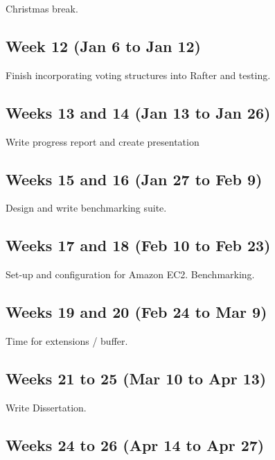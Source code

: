 \documentclass[12pt]{scrartcl}
\begin{document}
Christmas break.


\subsection{Week 12 (Jan 6 to Jan 12)%
  \label{week-12-jan-6-to-jan-12}%
}

Finish incorporating voting structures into Rafter and testing.


\subsection{Weeks 13 and 14 (Jan 13 to Jan 26)%
  \label{weeks-13-and-14-jan-13-to-jan-26}%
}

Write progress report and create presentation


\subsection{Weeks 15 and 16 (Jan 27 to Feb 9)%
  \label{weeks-15-and-16-jan-27-to-feb-9}%
}

Design and write benchmarking suite.


\subsection{Weeks 17 and 18 (Feb 10 to Feb 23)%
  \label{weeks-17-and-18-feb-10-to-feb-23}%
}

Set-up and configuration for Amazon EC2. Benchmarking.


\subsection{Weeks 19 and 20 (Feb 24 to Mar 9)%
  \label{weeks-19-and-20-feb-24-to-mar-9}%
}

Time for extensions / buffer.


\subsection{Weeks 21 to 25 (Mar 10 to Apr 13)%
  \label{weeks-21-to-25-mar-10-to-apr-13}%
}

Write Dissertation.


\subsection{Weeks 24 to 26 (Apr 14 to Apr 27)%
  \label{weeks-24-to-26-apr-14-to-apr-27}%
}
\end{document}
